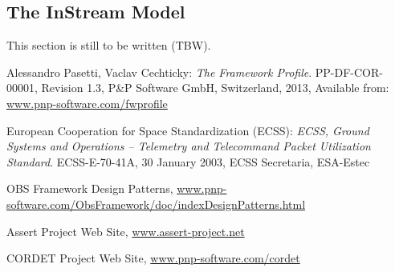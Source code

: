 \documentclass[a4paper,10pt]{article}
\begin{document}
\subsection{The InStream Model}\label{sec:InStreamModel}
This section is still to be written (TBW).

\newpage

\begin{thebibliography}{6}

 Alessandro Pasetti, Vaclav Cechticky:
           {\sl The Framework Profile}. PP-DF-COR-00001, Revision 1.3,
           P\&P Software GmbH, Switzerland, 2013, 
           Available from: \url{www.pnp-software.com/fwprofile}

 European Cooperation for Space Standardization (ECSS):
           {\sl ECSS, Ground Systems and Operations – Telemetry and Telecommand Packet Utilization Standard}. 
           ECSS-E-70-41A, 30 January 2003,
           ECSS Secretaria, ESA-Estec 

 OBS Framework Design Patterns, \url{www.pnp-software.com/ObsFramework/doc/indexDesignPatterns.html}

 Assert Project Web Site, \url{www.assert-project.net}

 CORDET Project Web Site, \url{www.pnp-software.com/cordet}

\end{thebibliography}
\end{document}
